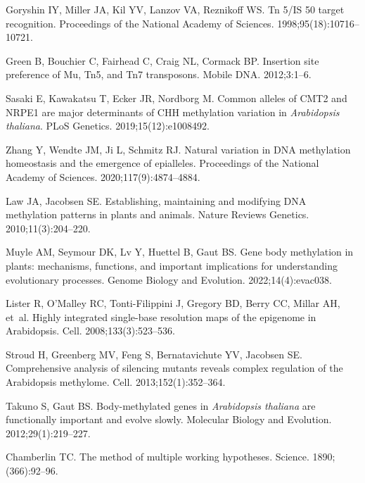 \documentclass[10pt,letterpaper,draft]{article}
\begin{document}
\begin{thebibliography}{10}
Goryshin IY, Miller JA, Kil YV, Lanzov VA, Reznikoff WS.
\newblock Tn 5/IS 50 target recognition.
\newblock Proceedings of the National Academy of Sciences. 1998;95(18):10716--10721.

Green B, Bouchier C, Fairhead C, Craig NL, Cormack BP.
\newblock Insertion site preference of Mu, Tn5, and Tn7 transposons.
\newblock Mobile DNA. 2012;3:1--6.

Sasaki E, Kawakatsu T, Ecker JR, Nordborg M.
\newblock Common alleles of CMT2 and NRPE1 are major determinants of CHH methylation variation in \emph{Arabidopsis thaliana}.
\newblock PLoS Genetics. 2019;15(12):e1008492.

Zhang Y, Wendte JM, Ji L, Schmitz RJ.
\newblock Natural variation in DNA methylation homeostasis and the emergence of epialleles.
\newblock Proceedings of the National Academy of Sciences. 2020;117(9):4874--4884.

Law JA, Jacobsen SE.
\newblock Establishing, maintaining and modifying DNA methylation patterns in plants and animals.
\newblock Nature Reviews Genetics. 2010;11(3):204--220.

Muyle AM, Seymour DK, Lv Y, Huettel B, Gaut BS.
\newblock Gene body methylation in plants: mechanisms, functions, and important implications for understanding evolutionary processes.
\newblock Genome Biology and Evolution. 2022;14(4):evac038.

Lister R, O'Malley RC, Tonti-Filippini J, Gregory BD, Berry CC, Millar AH, et~al.
\newblock Highly integrated single-base resolution maps of the epigenome in Arabidopsis.
\newblock Cell. 2008;133(3):523--536.

Stroud H, Greenberg MV, Feng S, Bernatavichute YV, Jacobsen SE.
\newblock Comprehensive analysis of silencing mutants reveals complex regulation of the Arabidopsis methylome.
\newblock Cell. 2013;152(1):352--364.

Takuno S, Gaut BS.
\newblock Body-methylated genes in \emph{Arabidopsis thaliana} are functionally important and evolve slowly.
\newblock Molecular Biology and Evolution. 2012;29(1):219--227.

Chamberlin TC.
\newblock The method of multiple working hypotheses.
\newblock Science. 1890;(366):92--96.


\end{thebibliography}
\end{document}
